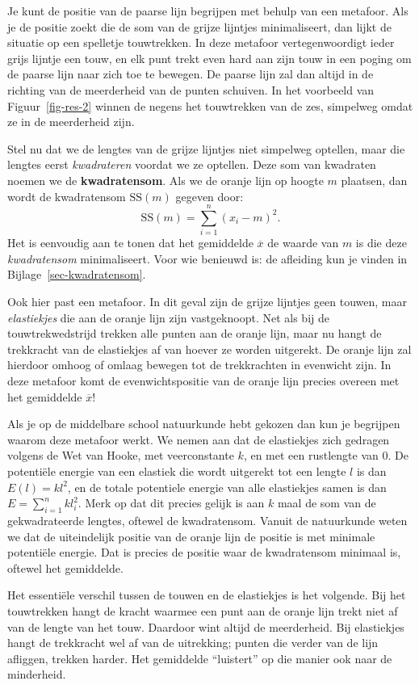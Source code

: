\documentclass[
  a4paper,
]{scrbook}
\theoremstyle{definition}
\theoremstyle{definition}
\theoremstyle{remark}
\begin{document}
Je kunt de positie van de paarse lijn begrijpen met behulp van een
metafoor. Als je de positie zoekt die de som van de grijze lijntjes
minimaliseert, dan lijkt de situatie op een spelletje touwtrekken. In
deze metafoor vertegenwoordigt ieder grijs lijntje een touw, en elk punt
trekt even hard aan zijn touw in een poging om de paarse lijn naar zich
toe te bewegen. De paarse lijn zal dan altijd in de richting van de
meerderheid van de punten schuiven. In het voorbeeld van
Figuur~\ref{fig-res-2} winnen de negens het touwtrekken van de zes,
simpelweg omdat ze in de meerderheid zijn.

Stel nu dat we de lengtes van de grijze lijntjes niet simpelweg
optellen, maar die lengtes eerst \emph{kwadrateren} voordat we ze
optellen. Deze som van kwadraten noemen we de \textbf{kwadratensom}. Als
we de oranje lijn op hoogte \(m\) plaatsen, dan wordt de kwadratensom
\(\mathrm{SS}(m)\) gegeven door:
\[ \mathrm{SS}(m) = \sum_{i=1}^n \left( x_i - m\right)^2.\] Het is
eenvoudig aan te tonen dat het gemiddelde \(\overline{x}\) de waarde van
\(m\) is die deze \emph{kwadratensom} minimaliseert. Voor wie benieuwd
is: de afleiding kun je vinden in Bijlage~\ref{sec-kwadratensom}.

Ook hier past een metafoor. In dit geval zijn de grijze lijntjes geen
touwen, maar \emph{elastiekjes} die aan de oranje lijn zijn
vastgeknoopt. Net als bij de touwtrekwedstrijd trekken alle punten aan
de oranje lijn, maar nu hangt de trekkracht van de elastiekjes af van
hoever ze worden uitgerekt. De oranje lijn zal hierdoor omhoog of omlaag
bewegen tot de trekkrachten in evenwicht zijn. In deze metafoor komt de
evenwichtspositie van de oranje lijn precies overeen met het gemiddelde
\(\overline{x}\)!

Als je op de middelbare school natuurkunde hebt gekozen dan kun je
begrijpen waarom deze metafoor werkt. We nemen aan dat de elastiekjes
zich gedragen volgens de Wet van Hooke, met veerconstante \(k\), en met
een rustlengte van 0. De potentiële energie van een elastiek die wordt
uitgerekt tot een lengte \(l\) is dan \(E(l) = k l^2\), en de totale
potentiele energie van alle elastiekjes samen is dan
\(E = \sum_{i = 1}^n k l_i^2\). Merk op dat dit precies gelijk is aan
\(k\) maal de som van de gekwadrateerde lengtes, oftewel de
kwadratensom. Vanuit de natuurkunde weten we dat de uiteindelijk positie
van de oranje lijn de positie is met minimale potentiële energie. Dat is
precies de positie waar de kwadratensom minimaal is, oftewel het
gemiddelde.

Het essentiële verschil tussen de touwen en de elastiekjes is het
volgende. Bij het touwtrekken hangt de kracht waarmee een punt aan de
oranje lijn trekt niet af van de lengte van het touw. Daardoor wint
altijd de meerderheid. Bij elastiekjes hangt de trekkracht wel af van de
uitrekking; punten die verder van de lijn afliggen, trekken harder. Het
gemiddelde ``luistert'' op die manier ook naar de minderheid.
\end{document}
